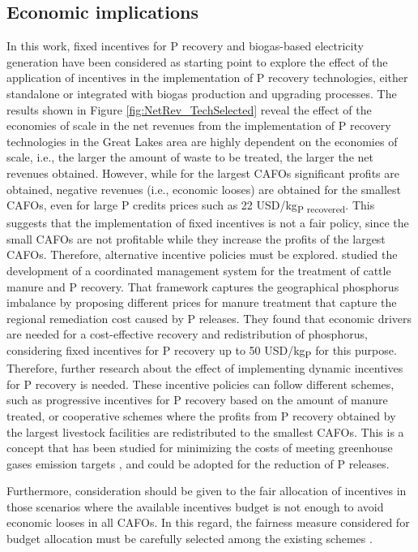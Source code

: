 \documentclass[authoryear]{elsarticle}
\begin{document}
\subsection{Economic implications}
In this work, fixed incentives for P recovery and biogas-based electricity generation have been considered as starting point to explore the effect of the application of incentives in the implementation of P recovery technologies, either standalone or integrated with biogas production and upgrading processes.		
The results shown in Figure \ref{fig:NetRev_TechSelected} reveal the effect of the economies of scale in the net revenues from the implementation of P recovery technologies in the Great Lakes area are highly dependent on the economies of scale, i.e., the larger the amount of waste to be treated, the larger the net revenues obtained. However, while for the largest CAFOs significant profits are obtained, negative revenues (i.e., economic looses) are obtained for the smallest CAFOs, even for large P credits prices such as 22 USD/kg\textsubscript{P recovered}. This suggests that the implementation of fixed incentives is not a fair policy, since the small CAFOs are not profitable while they increase the profits of the largest CAFOs. Therefore, alternative incentive policies must be explored. \citet{sampat2019coordinated} studied the development of a coordinated management system for the treatment of cattle manure and P recovery. That framework captures the geographical phosphorus imbalance by proposing different prices for manure treatment that capture the regional remediation cost caused by P releases. They found that economic drivers are needed for a cost-effective recovery and redistribution of phosphorus, considering fixed incentives for P recovery up to 50 USD/kg\textsubscript{P} for this purpose. Therefore, further research about the effect of implementing dynamic incentives for P recovery is needed. These incentive policies can follow different schemes, such as progressive incentives for P recovery based on the amount of manure treated, or cooperative schemes where the profits from P recovery obtained by the largest livestock facilities are redistributed to the smallest CAFOs. This is a concept that has been studied for minimizing the costs of meeting greenhouse gases emission targets \citep{galan2018time}, and could be adopted for the reduction of P releases.

Furthermore, consideration should be given to the fair allocation of incentives in those scenarios where the available incentives budget is not enough to avoid economic looses in all CAFOs. In this regard, the fairness measure considered for budget allocation must be carefully selected among the existing schemes \citep{sampat2019fairness}. 
\end{document}
